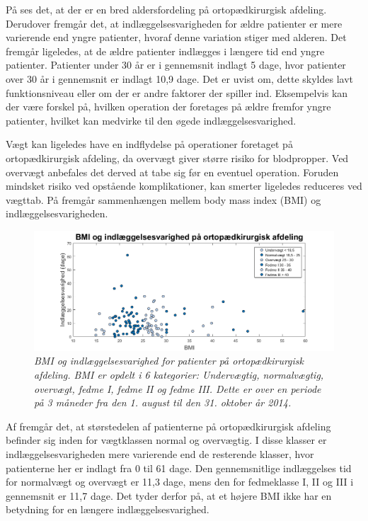 \noindent
På  ses det, at der er en bred aldersfordeling på ortopædkirurgisk afdeling. Derudover fremgår det, at indlæggelsesvarigheden for ældre patienter er mere varierende end yngre patienter, hvoraf denne variation stiger med alderen. Det fremgår ligeledes, at de ældre patienter indlægges i længere tid end yngre patienter. Patienter under $30$ år er i gennemsnit indlagt 5 dage, hvor patienter over $30$ år i gennemsnit er indlagt 10,9 dage. Det er uvist om, dette skyldes lavt funktionsniveau eller om der er andre faktorer der spiller ind. Eksempelvis kan der være forskel på, hvilken operation der foretages på ældre fremfor yngre patienter, hvilket kan medvirke til den øgede indlæggelsesvarighed.


Vægt kan ligeledes have en indflydelse på operationer foretaget på ortopædkirurgisk afdeling, da overvægt giver større risiko for blodpropper\cite{Ermonds2004}. Ved overvægt anbefales det derved at tabe sig før en eventuel operation. Foruden mindsket risiko ved opstående komplikationer, kan smerter ligeledes reduceres ved vægttab.\cite{Nordjylland2014} På  fremgår sammenhængen mellem body mass index (BMI) og indlæggelsesvarigheden.

\begin{figure}[H]
	\centering
	\includegraphics[scale=0.55]{figures/BMIogindlaeg}
	\caption{\textit{BMI og indlæggelsesvarighed for patienter på ortopædkirurgisk afdeling. BMI er opdelt i 6 kategorier: Undervægtig, normalvægtig, overvægt, fedme I, fedme II og fedme III. Dette er over en periode på 3 måneder fra den 1. august til den 31. oktober år 2014.}}
	\label{BMIogindlaeggelse}
\end{figure}


\noindent
Af  fremgår det, at størstedelen af patienterne på ortopædkirurgisk afdeling befinder sig inden for vægtklassen normal og overvægtig. I disse klasser er indlæggelsesvarigheden mere varierende end de resterende klasser, hvor patienterne her er indlagt fra 0 til 61 dage. Den gennemsnitlige indlæggelses tid for normalvægt og overvægt er 11,3 dage, mens den for fedmeklasse I, II og III i gennemsnit er 11,7 dage. Det tyder derfor på, at et højere BMI ikke har en betydning for en længere indlæggelsesvarighed. 


